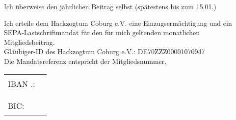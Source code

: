 

\vspace{.2cm}

	\fbox{\textcolor{white}{0}} \quad Ich überweise den jährlichen Beitrag selbst (spätestens bis zum 15.01.)
	
	\fbox{\textcolor{white}{0}} \quad Ich erteile dem Hackzogtum Coburg e.V. eine Einzugsermächtigung und ein SEPA-Lastschriftmandat für den für mich geltenden monatlichen Mitgliedsbeitrag. \\
	Gläubiger-ID des Hackzogtum Coburg e.V.: DE70ZZZ00001070947\\
	Die Mandatsreferenz entspricht der Mitgliedsnummer.\\	
	\vspace{-0.3cm}
  
  \begin{tabular}{ll}
	  {IBAN .:} & {\rule{12.35cm}{.3pt}}\\
	  \\
	  {BIC:} & {\rule{12.35cm}{.3pt}}
  \end{tabular}

\vspace{.5cm}